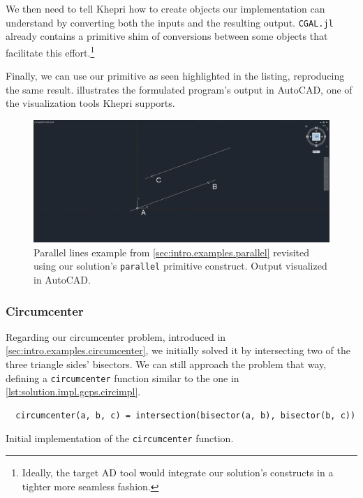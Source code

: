 We then need to tell Khepri how to create objects our implementation can
understand by converting both the inputs and the resulting output.
\texttt{CGAL.jl} already contains a primitive shim of conversions between some
objects that facilitate this effort.\footnote{Ideally, the target \ac{AD} tool
would integrate our solution's constructs in a tighter more seamless fashion.}

Finally, we can use our primitive as seen highlighted in the listing,
reproducing the same result.  illustrates
the formulated program's output in AutoCAD, one of the visualization tools
Khepri supports.

\begin{figure}[htbp]
  \includegraphics[width=\linewidth]{fig/autocad-parallel} 
  \caption[Parallel lines example using our solution]{
    Parallel lines example from \cref{sec:intro.examples.parallel} revisited
    using our solution's \texttt{parallel} primitive construct.  Output
    visualized in AutoCAD.}%
  \label{fig:solution.impl.gcps.parallel}
\end{figure}

\subsubsection{Circumcenter}%
\label{sec:solution.impl.gcps.circumcenter}

Regarding our circumcenter problem, introduced in
\cref{sec:intro.examples.circumcenter}, we initially solved it by intersecting
two of the three triangle sides' bisectors.  We can still approach the problem
that way, defining a \texttt{circumcenter} function similar to the one in
\cref{lst:solution.impl.gcps.circimpl}.

\begin{listing}[htbp]
  \begin{verbatim}
  circumcenter(a, b, c) = intersection(bisector(a, b), bisector(b, c)) 
  \end{verbatim}
  \caption[Initial circumcenter solution]{
    Initial implementation of the \texttt{circumcenter} function.}%
  \label{lst:solution.impl.gcps.circimpl}
\end{listing}

